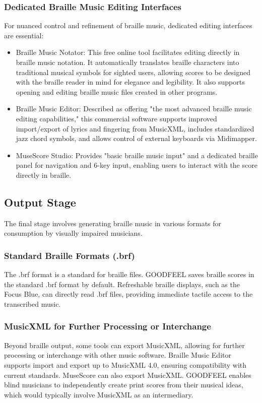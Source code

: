 \subsubsection{Dedicated Braille Music Editing Interfaces}
For nuanced control and refinement of braille music, dedicated editing interfaces are essential:
\begin{itemize}
    \item Braille Music Notator: This free online tool facilitates editing directly in braille music notation. It automatically translates braille characters into traditional musical symbols for sighted users, allowing scores to be designed with the braille reader in mind for elegance and legibility. \cite{pathstoliteracy-notator, braillemusicnotator} It also supports opening and editing braille music files created in other programs. \cite{braillemusicnotator}
    \item Braille Music Editor: Described as offering "the most advanced braille music editing capabilities," this commercial software supports improved import/export of lyrics and fingering from MusicXML, includes standardized jazz chord symbols, and allows control of external keyboards via Midimapper. \cite{braillemusiceditor}
    \item MuseScore Studio: Provides "basic braille music input" and a dedicated braille panel for navigation and 6-key input, enabling users to interact with the score directly in braille. \cite{soundwithoutsight-musescore, musescore-braille}
\end{itemize}

\subsection{Output Stage}
The final stage involves generating braille music in various formats for consumption by visually impaired musicians.

\subsubsection{Standard Braille Formats (.brf)}
The .brf format is a standard for braille files. GOODFEEL saves braille scores in the standard .brf format by default. \cite{dancingdots-goodfeel} Refreshable braille displays, such as the Focus Blue, can directly read .brf files, providing immediate tactile access to the transcribed music. \cite{focus-blue}

\subsubsection{MusicXML for Further Processing or Interchange}
Beyond braille output, some tools can export MusicXML, allowing for further processing or interchange with other music software. Braille Music Editor supports import and export up to MusicXML 4.0, ensuring compatibility with current standards. \cite{braillemusiceditor} MuseScore can also export MusicXML. \cite{musescore-accessibility} GOODFEEL enables blind musicians to independently create print scores from their musical ideas, which would typically involve MusicXML as an intermediary. \cite{dancingdots-goodfeel}

